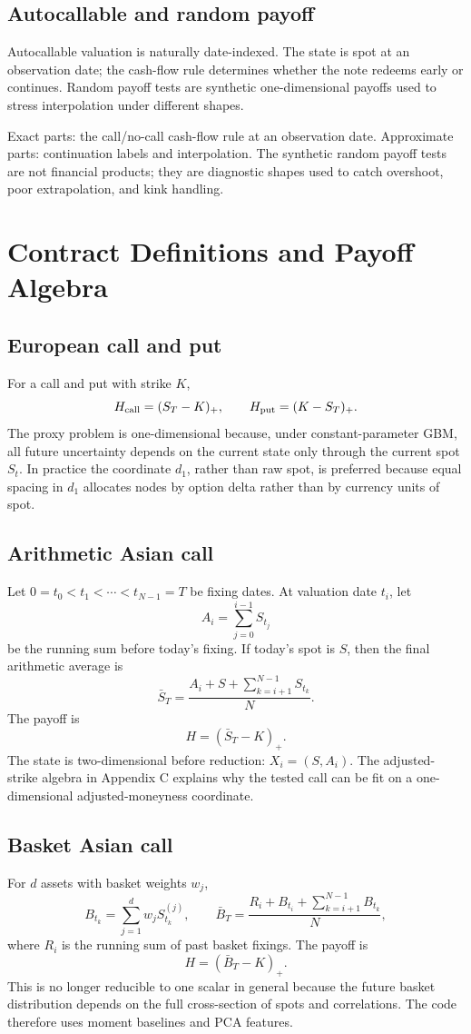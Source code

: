 \documentclass[11pt,oneside]{book}
\theoremstyle{definition}
\begin{document}
\section{Autocallable and random payoff}
Autocallable valuation is naturally date-indexed. The state is spot at an observation date; the cash-flow rule determines whether the note redeems early or continues. Random payoff tests are synthetic one-dimensional payoffs used to stress interpolation under different shapes.

Exact parts: the call/no-call cash-flow rule at an observation date. Approximate parts: continuation labels and interpolation. The synthetic random payoff tests are not financial products; they are diagnostic shapes used to catch overshoot, poor extrapolation, and kink handling.

\chapter{Contract Definitions and Payoff Algebra}

\section{European call and put}
For a call and put with strike \(K\),
\[
  H_{\rm call}=(S_T-K)_+,\qquad
  H_{\rm put}=(K-S_T)_+.
\]
The proxy problem is one-dimensional because, under constant-parameter GBM, all future uncertainty depends on the current state only through the current spot \(S_t\). In practice the coordinate \(d_1\), rather than raw spot, is preferred because equal spacing in \(d_1\) allocates nodes by option delta rather than by currency units of spot.

\section{Arithmetic Asian call}
Let \(0=t_0<t_1<\cdots<t_{N-1}=T\) be fixing dates. At valuation date \(t_i\), let
\[
  A_i=\sum_{j=0}^{i-1} S_{t_j}
\]
be the running sum before today's fixing. If today's spot is \(S\), then the final arithmetic average is
\[
  \bar S_T=\frac{A_i+S+\sum_{k=i+1}^{N-1}S_{t_k}}{N}.
\]
The payoff is
\[
  H=(\bar S_T-K)_+.
\]
The state is two-dimensional before reduction: \(X_i=(S,A_i)\). The adjusted-strike algebra in Appendix C explains why the tested call can be fit on a one-dimensional adjusted-moneyness coordinate.

\section{Basket Asian call}
For \(d\) assets with basket weights \(w_j\),
\[
  B_{t_k}=\sum_{j=1}^d w_j S_{t_k}^{(j)},\qquad
  \bar B_T=\frac{R_i+B_{t_i}+\sum_{k=i+1}^{N-1}B_{t_k}}{N},
\]
where \(R_i\) is the running sum of past basket fixings. The payoff is
\[
  H=(\bar B_T-K)_+.
\]
This is no longer reducible to one scalar in general because the future basket distribution depends on the full cross-section of spots and correlations. The code therefore uses moment baselines and PCA features.
\end{document}
